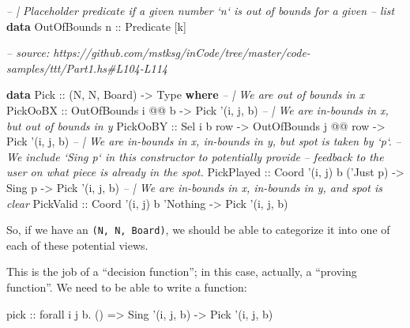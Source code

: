 \documentclass[]{article}
\newenvironment{Shaded}{}{}
\newcommand{\CommentTok}[1]{\textcolor[rgb]{0.38,0.63,0.69}{\textit{#1}}}
\newcommand{\DataTypeTok}[1]{\textcolor[rgb]{0.56,0.13,0.00}{#1}}
\newcommand{\FunctionTok}[1]{\textcolor[rgb]{0.02,0.16,0.49}{#1}}
\newcommand{\KeywordTok}[1]{\textcolor[rgb]{0.00,0.44,0.13}{\textbf{#1}}}
\newcommand{\NormalTok}[1]{#1}
\newcommand{\OtherTok}[1]{\textcolor[rgb]{0.00,0.44,0.13}{#1}}
\begin{document}
\begin{Shaded}
\begin{Highlighting}[]
\CommentTok{-- | Placeholder predicate if a given number `n` is out of bounds for a given}
\CommentTok{-- list}
\KeywordTok{data} \DataTypeTok{OutOfBounds}\OtherTok{ n ::} \DataTypeTok{Predicate}\NormalTok{ [k]}

\CommentTok{-- source: https://github.com/mstksg/inCode/tree/master/code-samples/ttt/Part1.hs#L104-L114}

\KeywordTok{data} \DataTypeTok{Pick}\OtherTok{ ::}\NormalTok{ (}\DataTypeTok{N}\NormalTok{, }\DataTypeTok{N}\NormalTok{, }\DataTypeTok{Board}\NormalTok{) }\OtherTok{->} \DataTypeTok{Type} \KeywordTok{where}
    \CommentTok{-- | We are out of bounds in x}
    \DataTypeTok{PickOoBX}\OtherTok{   ::} \DataTypeTok{OutOfBounds}\NormalTok{ i }\FunctionTok{@@}\NormalTok{ b                         }\OtherTok{->} \DataTypeTok{Pick}\NormalTok{ '(i, j, b)}
    \CommentTok{-- | We are in-bounds in x, but out of bounds in y}
    \DataTypeTok{PickOoBY}\OtherTok{   ::} \DataTypeTok{Sel}\NormalTok{ i b row        }\OtherTok{->} \DataTypeTok{OutOfBounds}\NormalTok{ j }\FunctionTok{@@}\NormalTok{ row }\OtherTok{->} \DataTypeTok{Pick}\NormalTok{ '(i, j, b)}
    \CommentTok{-- | We are in-bounds in x, in-bounds in y, but spot is taken by `p`.}
    \CommentTok{-- We include `Sing p` in this constructor to potentially provide}
    \CommentTok{-- feedback to the user on what piece is already in the spot.}
    \DataTypeTok{PickPlayed}\OtherTok{ ::} \DataTypeTok{Coord}\NormalTok{ '(i, j) b ('}\DataTypeTok{Just}\NormalTok{ p) }\OtherTok{->} \DataTypeTok{Sing}\NormalTok{ p        }\OtherTok{->} \DataTypeTok{Pick}\NormalTok{ '(i, j, b)}
    \CommentTok{-- | We are in-bounds in x, in-bounds in y, and spot is clear}
    \DataTypeTok{PickValid}\OtherTok{  ::} \DataTypeTok{Coord}\NormalTok{ '(i, j) b '}\DataTypeTok{Nothing}                   \OtherTok{->} \DataTypeTok{Pick}\NormalTok{ '(i, j, b)}
\end{Highlighting}
\end{Shaded}

So, if we have an \texttt{(N,\ N,\ Board)}, we should be able to categorize it
into one of each of these potential views.

This is the job of a ``decision function''; in this case, actually, a ``proving
function''. We need to be able to write a function:

\begin{Shaded}
\begin{Highlighting}[]
\OtherTok{pick ::}\NormalTok{ forall i j b}\FunctionTok{.}\NormalTok{ ()}
     \OtherTok{=>} \DataTypeTok{Sing}\NormalTok{ '(i, j, b) }\OtherTok{->} \DataTypeTok{Pick}\NormalTok{ '(i, j, b)}
\end{Highlighting}
\end{Shaded}
\end{document}
